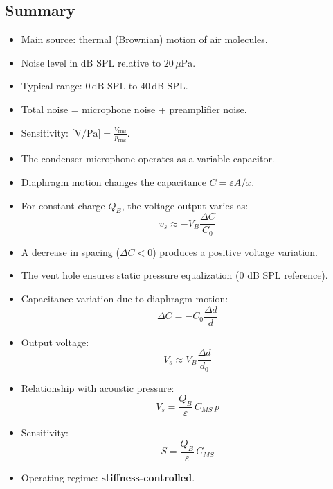 \subsection{Summary}

\begin{tcolorbox}[colback=gray!10!white,colframe=black,title=\textbf{Summary – Microphone Noise}]
\begin{itemize}
    \item Main source: thermal (Brownian) motion of air molecules.
    \item Noise level in dB SPL relative to \(20\,\mu\text{Pa}\).
    \item Typical range: \(0\,\text{dB SPL} \text{ to } 40\,\text{dB SPL}\).
    \item Total noise = microphone noise + preamplifier noise.
    \item Sensitivity: \( \text{[V/Pa]} = \frac{V_{\text{rms}}}{p_{\text{rms}}} \).
\end{itemize}
\end{tcolorbox}



\begin{tcolorbox}[colback=gray!10!white,colframe=black,title=\textbf{Summary – Condenser Microphone Principle}]
\begin{itemize}
    \item The condenser microphone operates as a variable capacitor.
    \item Diaphragm motion changes the capacitance \( C = \varepsilon A / x \).
    \item For constant charge \( Q_B \), the voltage output varies as:
    \[
    v_s \approx -V_B \frac{\Delta C}{C_0}
    \]
    \item A decrease in spacing (\( \Delta C < 0 \)) produces a positive voltage variation.
    \item The vent hole ensures static pressure equalization (0 dB SPL reference).
\end{itemize}
\end{tcolorbox}


\begin{tcolorbox}[colback=gray!10!white,colframe=black,title=\textbf{Summary – Condenser Microphone Sensitivity}]
\begin{itemize}
    \item Capacitance variation due to diaphragm motion:
    \[
    \Delta C = -C_0 \frac{\Delta d}{d}
    \]
    \item Output voltage:
    \[
    V_s \approx V_B \frac{\Delta d}{d_0}
    \]
    \item Relationship with acoustic pressure:
    \[
    V_s = \frac{Q_B}{\varepsilon} \, C_{MS} \, p
    \]
    \item Sensitivity:
    \[
    S = \frac{Q_B}{\varepsilon} \, C_{MS}
    \]
    \item Operating regime: \textbf{stiffness-controlled}.
\end{itemize}
\end{tcolorbox}



